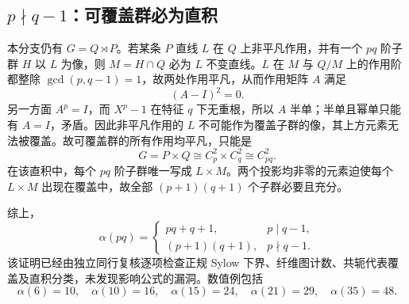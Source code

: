 \documentclass[11pt,a4paper]{article}
\numberwithin{equation}{section}
\theoremstyle{plain}
\theoremstyle{definition}
\theoremstyle{remark}
\begin{document}
\subsection{\texorpdfstring{$p\nmid q-1$}{p not|q-1}：可覆盖群必为直积}
本分支仍有 $G=Q\rtimes P$。若某条 $P$ 直线 $L$ 在 $Q$ 上非平凡作用，并有一个 $pq$ 阶子群 $H$ 以 $L$ 为像，则 $M=H\cap Q$ 必为 $L$ 不变直线。$L$ 在 $M$ 与 $Q/M$ 上的作用阶都整除 $\gcd(p,q-1)=1$，故两处作用平凡，从而作用矩阵 $A$ 满足
\begin{equation}
 (A-I)^2=0.
\end{equation}
另一方面 $A^p=I$，而 $X^p-1$ 在特征 $q$ 下无重根，所以 $A$ 半单；半单且幂单只能有 $A=I$，矛盾。因此非平凡作用的 $L$ 不可能作为覆盖子群的像，其上方元素无法被覆盖。故可覆盖群的所有作用均平凡，只能是
\begin{equation}
 G=P\times Q\cong C_p^2\times C_q^2\cong C_{pq}^2.
\end{equation}
在该直积中，每个 $pq$ 阶子群唯一写成 $L\times M$。两个投影均非零的元素迫使每个 $L\times M$ 出现在覆盖中，故全部 $(p+1)(q+1)$ 个子群必要且充分。

综上，
\begin{equation}\label{eq:pq-final}
 \boxed{\alpha(pq)=
 \begin{cases}
 pq+q+1,&p\mid q-1,\\[3pt]
 (p+1)(q+1),&p\nmid q-1.
 \end{cases}}
\end{equation}
该证明已经由独立同行复核逐项检查正规 Sylow 下界、纤维图计数、共轭代表覆盖及直积分类，未发现影响公式的漏洞。数值例包括
\begin{equation}
 \alpha(6)=10,\quad \alpha(10)=16,\quad
 \alpha(15)=24,\quad \alpha(21)=29,\quad \alpha(35)=48.
\end{equation}
\end{document}

